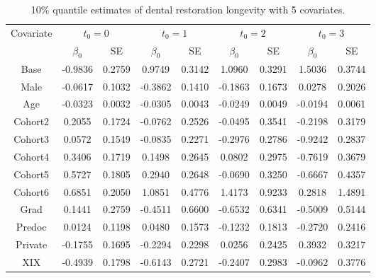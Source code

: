 \documentclass[titlepage,english,12pt]{article}
\begin{document}
	\begin{table}[H] \label{table:10}
		\caption{10\% quantile estimates of dental restoration longevity with 5 covariates.}
		\centering
		\begin{tabular}{|c|c|c|c|c|c|c|c|c|}
			\hline
			\multirow{2}{*}{Covariate} & \multicolumn{2}{c|}{$t_0=0$} & \multicolumn{2}{c|}{$t_0=1$} & \multicolumn{2}{c|}{$t_0=2$} & \multicolumn{2}{c|}{$t_0=3$}\\ 
			\cline{2-9}
			& $\beta_0$ & SE & $\beta_0$ & SE & $\beta_0$ & SE & $\beta_0$ & SE\\
			\hline\hline
			Base & -0.9836 & 0.2759 & 0.9749 & 0.3142 & 1.0960 & 0.3291 & 1.5036 & 0.3744 \\ 
			Male & -0.0617 & 0.1032 & -0.3862 & 0.1410 & -0.1863 & 0.1673 & 0.0278 & 0.2026 \\ 
			Age & -0.0323 & 0.0032 & -0.0305 & 0.0043 & -0.0249 & 0.0049 & -0.0194 & 0.0061 \\ 
			Cohort2 & 0.2055 & 0.1724 & -0.0762 & 0.2526 & -0.0495 & 0.3541 & -0.2198 & 0.3179 \\ 
			Cohort3 & 0.0572 & 0.1549 & -0.0835 & 0.2271 & -0.2976 & 0.2786 & -0.9242 & 0.2837 \\ 
			Cohort4 & 0.3406 & 0.1719 & 0.1498 & 0.2645 & 0.0802 & 0.2975 & -0.7619 & 0.3679 \\ 
			Cohort5 & 0.5727 & 0.1805 & 0.2940 & 0.2648 & -0.0690 & 0.3250 & -0.6667 & 0.4357 \\ 
			Cohort6 & 0.6851 & 0.2050 & 1.0851 & 0.4776 & 1.4173 & 0.9233 & 0.2818 & 1.4891 \\ 
			Grad & 0.1441 & 0.2759 & -0.4511 & 0.6600 & -0.6532 & 0.6341 & -0.5009 & 0.5144 \\ 
			Predoc & 0.0124 & 0.1198 & 0.0480 & 0.1573 & -0.1232 & 0.1813 & -0.2720 & 0.2416 \\ 
			Private & -0.1755 & 0.1695 & -0.2294 & 0.2298 & 0.0256 & 0.2425 & 0.3932 & 0.3217 \\ 
			XIX & -0.4939 & 0.1798 & -0.6143 & 0.2721 & -0.2407 & 0.2983 & -0.0962 & 0.3776 \\ 
			\hline
		\end{tabular}
	\end{table}
\end{document}
